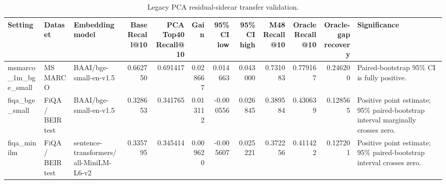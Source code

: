 \begin{table}[t]
\caption{Legacy PCA residual-sidecar transfer validation.}
\label{tab:pca-transfer}
\begin{tabular}{lllrrrrrrrrl}
\toprule
Setting & Dataset & Embedding model & Base Recall@10 & PCA Top40 Recall@10 & Gain & 95\% CI low & 95\% CI high & M48 Recall@10 & Oracle Recall@10 & Oracle-gap recovery & Significance \\
\midrule
msmarco\_1m\_bge\_small & MS MARCO & BAAI/bge-small-en-v1.5 & 0.662750 & 0.691417 & 0.028667 & 0.014663 & 0.043000 & 0.731083 & 0.779167 & 0.246200 & Paired-bootstrap 95\% CI is fully positive. \\
fiqa\_bge\_small & FiQA / BEIR test & BAAI/bge-small-en-v1.5 & 0.328653 & 0.341765 & 0.013112 & -0.000556 & 0.026845 & 0.389584 & 0.430639 & 0.128565 & Positive point estimate; 95\% paired-bootstrap interval marginally crosses zero. \\
fiqa\_minilm & FiQA / BEIR test & sentence-transformers/all-MiniLM-L6-v2 & 0.335795 & 0.345414 & 0.009620 & -0.005607 & 0.025221 & 0.372256 & 0.411422 & 0.127201 & Positive point estimate; 95\% paired-bootstrap interval crosses zero. \\
\bottomrule
\end{tabular}
\end{table}
